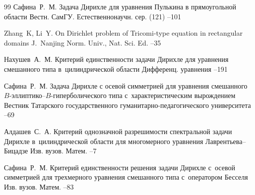 \begin{thebibliography}{99}
\by Сафина~Р.~М.
\paper Задача Дирихле для уравнения Пулькина в прямоугольной области
\jour Вестн. СамГУ. Естественнонаучн. сер.
(121)
--101


\by Zhang~K, Li~Y.
\paper On Dirichlet problem of Tricomi-type equation in rectangular domains
\jour J.~Nanjing Norm. Univ., Nat. Sci. Ed.
--35 


\by Нахушев~А.~М.
\paper Критерий единственности задачи Дирихле для уравнения смешанного типа в~цилиндрической области
\jour Дифференц. уравнения
--191




\by Сафина~Р.~М.
\paper Задача Дирихле с осевой симметрией для уравнения смешанного $B$-эллиптико--$B$-гиперболического типа с~характеристическим вырождением
\jour Вестник Татарского государственного гуманитарно-педагогического университета 
–69

\by Алдашев~С.~А.
\paper Критерий однозначной разрешимости спектральной задачи Дирихле в~цилиндрической области для многомерного уравнения Лаврентьева--Бицадзе
\jour Изв. вузов. Матем.
--7


\by Сафина~Р.~М.
\paper Критерий единственности решения задачи Дирихле с~осевой симметрией для трехмерного уравнения смешанного типа с~оператором Бесселя
\jour Изв. вузов. Матем.
--83


\end{thebibliography}
